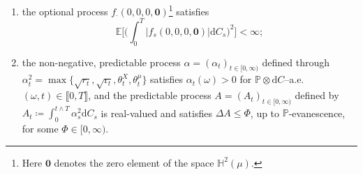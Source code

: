 \documentclass[10pt]{article} %
\newcommand{\vertiii}[1]{{\left\vert\kern-0.25ex\left\vert\kern-0.25ex\left\vert #1 \right\vert\kern-0.25ex\right\vert\kern-0.25ex\right\vert}}
\def \E{\mathbb{E}}
\def \H{\mathbb{H}}
\def \P{\mathbb{P}}
\def \R{\mathbb{R}}
\def\d{\mathrm{d}}
\begin{document}
\begin{enumerate}[{\bf(D1)}, leftmargin=0.9cm]
		\begin{equation*}
		\Omega \times [0,\infty) \ni (\omega,t) \longmapsto f_t(\omega,y,\mathrm{y},z,u_t(\omega; \cdot) ) \in \R,
	\end{equation*}
	is optional and $f$ is $(r,\theta^X,\theta^\mu)$--Lipschitz continuous on $\llbracket 0, T \rrbracket \coloneqq \{(\omega,t) \in \Omega \times [0,\infty) : t \leq T(\omega) \}$ in the sense that
			\begin{align*}
		\big|f_t(\omega,y,\mathrm{y},z,u_t(\omega; \cdot)) - f_t(\omega,y^\prime,\mathrm{y}^\prime,z^\prime,u_t^\prime(\omega; \cdot))\big|^2 
		&\leq r_t(\omega) |y-y^\prime|^2 + \mathrm{r}_t(\omega) |\mathrm{y}-\mathrm{y}^\prime|^2 \\
		&\quad + \theta^X_t(\omega) \|c_t^{1/2}(\omega)(z-z^\prime)\|^2 + \theta^\mu_t(\omega) \Big(\vertiii{u_t(\omega;\cdot) - u^\prime_t(\omega;\cdot)}_t(\omega) \Big)^2,
	\end{align*}
			for $\P \otimes \d C$--a.e. $(\omega,t) \in \llbracket 0, T \rrbracket$, where $r = (r_t)_{t \in [0,\infty)}$, $\mathrm{r} = (\mathrm{r}_t)_{t \in [0,\infty)}$, $\theta^X = (\theta^X_t)_{t \in [0,\infty)}$ and $\theta^\mu =(\theta^\mu_t)_{t \in [0,\infty)}$ are $[0,\infty)$-valued, predictable processes, and $c^{1/2}$ is the unique square-root matrix-valued process of $c$;\footnote{See \citeauthor*{horn2013matrix} \cite[page 439]{horn2013matrix}.}
		\item \label{data::integ_f0} the optional process $f_\cdot(0,0,0,\mathbf{0})$\footnote{Here $\mathbf{0}$ denotes the zero element of the space $\H^2(\mu)$.} satisfies
		\begin{equation*}
			\E \bigg[\bigg(\int_0^T |f_s(0,0,0,\mathbf{0})| \d C_s \bigg)^2 \bigg] < \infty;
		\end{equation*}
	\item \label{data::process_A} the non-negative, predictable process $\alpha = (\alpha_t)_{t \in [0,\infty)}$ defined through $\alpha^2_t = \max\{\sqrt{r_t},\sqrt{\mathrm{r}_t},\theta^X_t,\theta^\mu_t\}$ satisfies $\alpha_t(\omega) > 0$ for $\P \otimes \d C$--a.e. $(\omega,t) \in \llbracket 0,T\rrbracket$, and the predictable process $A = (A_t)_{t \in [0,\infty)}$ defined by $A_t \coloneqq \int_0^{t \land T} \alpha^2_s \d C_s$ is real-valued and satisfies $\Delta A \leq \Phi$, up to $\P$-evanescence, for some $\Phi \in [0,\infty)$.
\end{enumerate}
\end{document}
